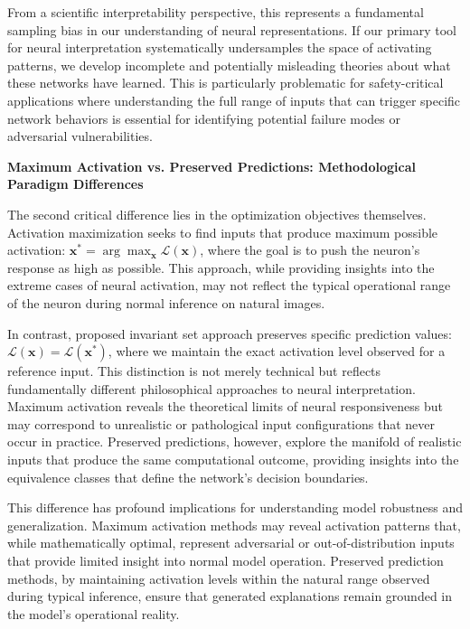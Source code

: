 From a scientific interpretability perspective, this represents a fundamental sampling bias in our understanding of neural representations. If our primary tool for neural interpretation systematically undersamples the space of activating patterns, we develop incomplete and potentially misleading theories about what these networks have learned. This is particularly problematic for safety-critical applications where understanding the full range of inputs that can trigger specific network behaviors is essential for identifying potential failure modes or adversarial vulnerabilities.

\textbf{Maximum Activation vs. Preserved Predictions: Methodological Paradigm Differences}

The second critical difference lies in the optimization objectives themselves. Activation maximization seeks to find inputs that produce maximum possible activation: $\mathbf{x}^* = \arg\max_{\mathbf{x}} \mathcal{L}(\mathbf{x})$, where the goal is to push the neuron's response as high as possible. This approach, while providing insights into the extreme cases of neural activation, may not reflect the typical operational range of the neuron during normal inference on natural images.

In contrast, proposed invariant set approach preserves specific prediction values: $\mathcal{L}(\mathbf{x}) = \mathcal{L}(\mathbf{x^*})$, where we maintain the exact activation level observed for a reference input. This distinction is not merely technical but reflects fundamentally different philosophical approaches to neural interpretation. Maximum activation reveals the theoretical limits of neural responsiveness but may correspond to unrealistic or pathological input configurations that never occur in practice. Preserved predictions, however, explore the manifold of realistic inputs that produce the same computational outcome, providing insights into the equivalence classes that define the network's decision boundaries.

This difference has profound implications for understanding model robustness and generalization. Maximum activation methods may reveal activation patterns that, while mathematically optimal, represent adversarial or out-of-distribution inputs that provide limited insight into normal model operation. Preserved prediction methods, by maintaining activation levels within the natural range observed during typical inference, ensure that generated explanations remain grounded in the model's operational reality.

